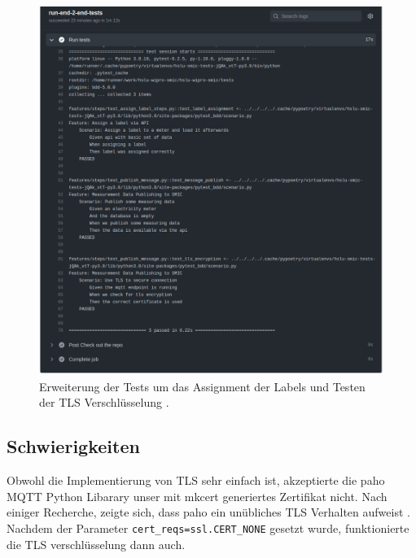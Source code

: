 \begin{figure}[h]
    \centering
    \includegraphics[width=1.0\textwidth]{gfx/testlog-iteration-2}
    \caption{
        Erweiterung der Tests um das Assignment der Labels und Testen der \ac{TLS} Verschlüsselung \parencite{randombenj_testlog_it_2_2021}.
    }
    \label{fig:test-iteration-3}
\end{figure}

\subsection{Schwierigkeiten}

Obwohl die Implementierung von \ac{TLS} sehr einfach ist, akzeptierte die paho \ac{MQTT} Python
Libarary unser mit mkcert generiertes Zertifikat nicht.
Nach einiger Recherche, zeigte sich, dass paho ein unübliches \ac{TLS}
Verhalten aufweist \parencite{eclipse_paho_ssl_2019}.
Nachdem der Parameter \texttt{cert\_reqs=ssl.CERT\_NONE} gesetzt wurde, funktionierte
die \ac{TLS} verschlüsselung dann auch.